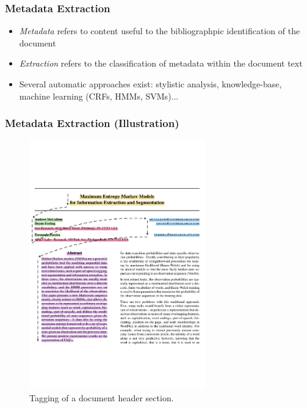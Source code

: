 \documentclass{beamer}
\begin{document}

\begin{frame}
\frametitle{Metadata Extraction}
\begin{itemize}
\item \emph{Metadata} refers to content useful to the bibliographpic identification of the document
\item \emph{Extraction} refers to the classification of metadata within the document text
\item Several automatic approaches exist: stylistic analysis, knowledge-base, machine learning (CRFs, HMMs, SVMs)...
\end{itemize}
\end{frame}


\begin{frame}
\frametitle{Metadata Extraction (Illustration)}
\begin{figure}[h]
\center
\includegraphics[width=3in]{Figures/extraction.pdf}
\caption{Tagging of a document header section.}
\end{figure}
\end{frame}

\end{document}
